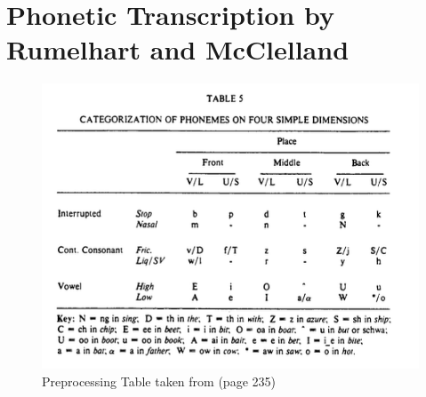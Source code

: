 \documentclass[12pt,twoside,a4paper]{book}
\begin{document}
\appendix

\chapter{Phonetic Transcription by Rumelhart and McClelland}
\label{apendice:rumelhart}
\begin{figure}
    \centering
    \includegraphics[scale=0.8]{img/rumelhartpreprocess.png}
    \caption{Preprocessing Table taken from \cite{rumelhart:1986} (page 235)}
    \label{fig:preprocess-rumelhart}
\end{figure}

% 

% 

\backmatter





\end{document}
